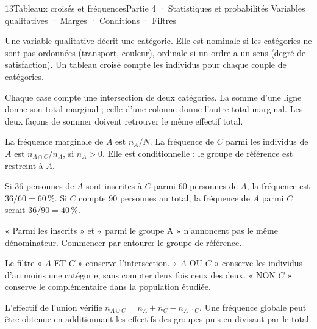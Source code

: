 \begin{ouverture}[statistique]{13}{Tableaux croisés et fréquences}{Partie 4 · Statistiques et probabilités}
{Variables qualitatives · Marges · Conditions · Filtres}
\end{ouverture}
\pagestyle{otMain}\essentiel\fontsize{11}{15}\selectfont
{}
\begin{definition}Une variable qualitative décrit une catégorie. Elle est nominale si les catégories ne sont pas ordonnées (transport, couleur), ordinale si un ordre a un sens (degré de satisfaction). Un tableau croisé compte les individus pour chaque couple de catégories.\end{definition}
\begin{savoirfaire}
Chaque case compte une intersection de deux catégories. La somme d’une ligne donne son total marginal ; celle d’une colonne donne l’autre total marginal. Les deux façons de sommer doivent retrouver le même effectif total.
\end{savoirfaire}
\begin{definition}La fréquence marginale de $A$ est $n_A/N$. La fréquence de $C$ parmi les individus de $A$ est $n_{A\cap C}/n_A$, si $n_A>0$. Elle est conditionnelle : le groupe de référence est restreint à $A$.\end{definition}
\begin{exemple}Si 36 personnes de $A$ sont inscrites à $C$ parmi 60 personnes de $A$, la fréquence est $36/60=60\,\%$. Si $C$ compte 90 personnes au total, la fréquence de $A$ parmi $C$ serait $36/90=40\,\%$.\end{exemple}
\begin{attention}« Parmi les inscrits » et « parmi le groupe A » n’annoncent pas le même dénominateur. Commencer par entourer le groupe de référence.\end{attention}
\clearpage
{}
\begin{savoirfaire}[ET, OU, NON]
Le filtre « $A$ ET $C$ » conserve l’intersection. « $A$ OU $C$ » conserve les individus d’au moins une catégorie, sans compter deux fois ceux des deux. « NON $C$ » conserve le complémentaire dans la population étudiée.
\end{savoirfaire}
\begin{propriete}L’effectif de l’union vérifie $n_{A\cup C}=n_A+n_C-n_{A\cap C}$. Une fréquence globale peut être obtenue en additionnant les effectifs des groupes puis en divisant par le total.\end{propriete}
